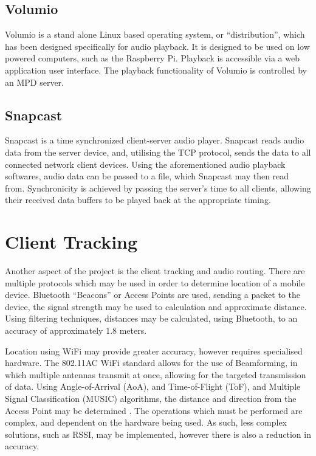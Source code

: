\documentclass[11pt,a4paper]{scrreprt}
\begin{document}
\subsection{Volumio}\label{volumio}

Volumio is a stand alone Linux based operating system, or
``distribution'', which has been designed specifically for audio
playback\cite{Volumio18}. It is designed to be used on low powered
computers, such as the Raspberry Pi. Playback is accessible via a web
application user interface. The playback functionality of Volumio is
controlled by an MPD server.

\subsection{Snapcast}\label{snapcast}

Snapcast is a time synchronized client-server audio player. Snapcast
reads audio data from the server device, and, utilising the TCP
protocol, sends the data to all connected network client devices. Using
the aforementioned audio playback softwares, audio data can be passed to
a file, which Snapcast may then read from. Synchronicity is achieved by
passing the server's time to all clients, allowing their received data
buffers to be played back at the appropriate timing.

\section{Client Tracking}\label{client-tracking}

Another aspect of the project is the client tracking and audio routing.
There are multiple protocols which may be used in order to determine
location of a mobile device. Bluetooth ``Beacons'' or Access Points are
used, sending a packet to the device, the signal strength may be used to
calculation and approximate distance\cite{Park15}. Using filtering
techniques, distances may be calculated, using Bluetooth, to an accuracy
of approximately 1.8 meters\cite{Park15}.

Location using WiFi may provide greater accuracy, however requires
specialised hardware\cite{Gjengset14}. The 802.11AC WiFi standard allows
for the use of Beamforming, in which multiple antennas transmit at once,
allowing for the targeted transmission of data\cite{Heejung14}. Using
Angle-of-Arrival (AoA), and Time-of-Flight (ToF), and Multiple Signal
Classification (MUSIC) algorithms, the distance and direction from the
Access Point may be determined \cite{Afaz18}. The operations which must
be performed are complex, and dependent on the hardware being used. As
such, less complex solutions, such as RSSI, may be implemented, however
there is also a reduction in accuracy.
\end{document}

